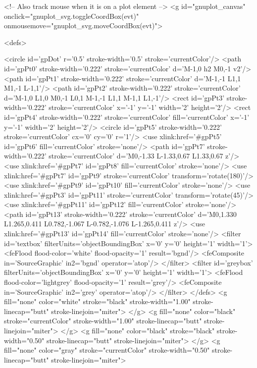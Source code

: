 <!-- Also track mouse when it is on a plot element -->
<g id="gnuplot_canvas" onclick="gnuplot_svg.toggleCoordBox(evt)" onmousemove="gnuplot_svg.moveCoordBox(evt)">

<defs>

	<circle id='gpDot' r='0.5' stroke-width='0.5' stroke='currentColor'/>
	<path id='gpPt0' stroke-width='0.222' stroke='currentColor' d='M-1,0 h2 M0,-1 v2'/>
	<path id='gpPt1' stroke-width='0.222' stroke='currentColor' d='M-1,-1 L1,1 M1,-1 L-1,1'/>
	<path id='gpPt2' stroke-width='0.222' stroke='currentColor' d='M-1,0 L1,0 M0,-1 L0,1 M-1,-1 L1,1 M-1,1 L1,-1'/>
	<rect id='gpPt3' stroke-width='0.222' stroke='currentColor' x='-1' y='-1' width='2' height='2'/>
	<rect id='gpPt4' stroke-width='0.222' stroke='currentColor' fill='currentColor' x='-1' y='-1' width='2' height='2'/>
	<circle id='gpPt5' stroke-width='0.222' stroke='currentColor' cx='0' cy='0' r='1'/>
	<use xlink:href='#gpPt5' id='gpPt6' fill='currentColor' stroke='none'/>
	<path id='gpPt7' stroke-width='0.222' stroke='currentColor' d='M0,-1.33 L-1.33,0.67 L1.33,0.67 z'/>
	<use xlink:href='#gpPt7' id='gpPt8' fill='currentColor' stroke='none'/>
	<use xlink:href='#gpPt7' id='gpPt9' stroke='currentColor' transform='rotate(180)'/>
	<use xlink:href='#gpPt9' id='gpPt10' fill='currentColor' stroke='none'/>
	<use xlink:href='#gpPt3' id='gpPt11' stroke='currentColor' transform='rotate(45)'/>
	<use xlink:href='#gpPt11' id='gpPt12' fill='currentColor' stroke='none'/>
	<path id='gpPt13' stroke-width='0.222' stroke='currentColor' d='M0,1.330 L1.265,0.411 L0.782,-1.067 L-0.782,-1.076 L-1.265,0.411 z'/>
	<use xlink:href='#gpPt13' id='gpPt14' fill='currentColor' stroke='none'/>
	<filter id='textbox' filterUnits='objectBoundingBox' x='0' y='0' height='1' width='1'>
	  <feFlood flood-color='white' flood-opacity='1' result='bgnd'/>
	  <feComposite in='SourceGraphic' in2='bgnd' operator='atop'/>
	</filter>
	<filter id='greybox' filterUnits='objectBoundingBox' x='0' y='0' height='1' width='1'>
	  <feFlood flood-color='lightgrey' flood-opacity='1' result='grey'/>
	  <feComposite in='SourceGraphic' in2='grey' operator='atop'/>
	</filter>
</defs>
<g fill="none" color="white" stroke="black" stroke-width="1.00" stroke-linecap="butt" stroke-linejoin="miter">
</g>
<g fill="none" color="black" stroke="currentColor" stroke-width="1.00" stroke-linecap="butt" stroke-linejoin="miter">
</g>
<g fill="none" color="black" stroke="black" stroke-width="0.50" stroke-linecap="butt" stroke-linejoin="miter">
</g>
<g fill="none" color="gray" stroke="currentColor" stroke-width="0.50" stroke-linecap="butt" stroke-linejoin="miter">
